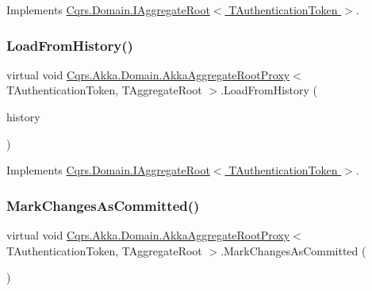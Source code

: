 Implements \hyperlink{interfaceCqrs_1_1Domain_1_1IAggregateRoot_a22fda414613f5ac0d4371554d7d6473b}{Cqrs.\+Domain.\+I\+Aggregate\+Root$<$ T\+Authentication\+Token $>$}.

\mbox{\label{classCqrs_1_1Akka_1_1Domain_1_1AkkaAggregateRootProxy_ae611077a51a215aef7fd0e106734b386}} 
\subsubsection{\texorpdfstring{Load\+From\+History()}{LoadFromHistory()}}
{\footnotesize\ttfamily virtual void \hyperlink{classCqrs_1_1Akka_1_1Domain_1_1AkkaAggregateRootProxy}{Cqrs.\+Akka.\+Domain.\+Akka\+Aggregate\+Root\+Proxy}$<$ T\+Authentication\+Token, T\+Aggregate\+Root $>$.Load\+From\+History (\begin{DoxyParamCaption}\item[{I\+Enumerable$<$ \hyperlink{interfaceCqrs_1_1Events_1_1IEvent}{I\+Event}$<$ T\+Authentication\+Token $>$$>$}]{history }\end{DoxyParamCaption})\hspace{0.3cm}{\ttfamily [virtual]}}



Implements \hyperlink{interfaceCqrs_1_1Domain_1_1IAggregateRoot_afe9329ee26ae68613059189ca64dfe60}{Cqrs.\+Domain.\+I\+Aggregate\+Root$<$ T\+Authentication\+Token $>$}.

\mbox{\label{classCqrs_1_1Akka_1_1Domain_1_1AkkaAggregateRootProxy_aaa8a46fee21b6133ae4d1b2f60983d7e}} 
\subsubsection{\texorpdfstring{Mark\+Changes\+As\+Committed()}{MarkChangesAsCommitted()}}
{\footnotesize\ttfamily virtual void \hyperlink{classCqrs_1_1Akka_1_1Domain_1_1AkkaAggregateRootProxy}{Cqrs.\+Akka.\+Domain.\+Akka\+Aggregate\+Root\+Proxy}$<$ T\+Authentication\+Token, T\+Aggregate\+Root $>$.Mark\+Changes\+As\+Committed (\begin{DoxyParamCaption}{ }\end{DoxyParamCaption})\hspace{0.3cm}{\ttfamily [virtual]}}



